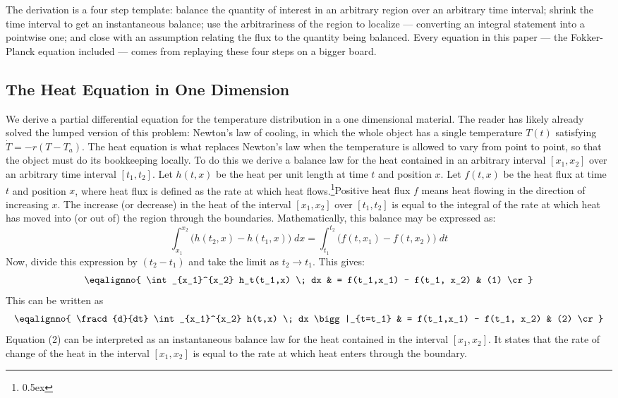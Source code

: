 The derivation is a four step template: balance the quantity of
interest in an arbitrary region over an arbitrary time interval;
shrink the time interval to get an instantaneous balance; use the
arbitrariness of the region to localize --- converting an integral
statement into a pointwise one; and close with an assumption relating
the flux to the quantity being balanced. Every equation in this paper
--- the Fokker-Planck equation included --- comes from replaying
these four steps on a bigger board.


\subsection{The Heat Equation in One Dimension}
We derive a partial differential equation for the temperature distribution
in a one dimensional material. The reader has likely already solved the
lumped version of this problem: Newton's law of cooling, in which the whole
object has a single temperature $T(t)$ satisfying $\dot T = -r(T - T_a)$.
The heat equation is what replaces Newton's law when the temperature is
allowed to vary from point to point, so that the object must do its
bookkeeping locally. To do this we
derive a balance law for the heat contained in an arbitrary interval
$[x_1,x_2]$ over an arbitrary time interval $[t_1, t_2]$.
Let $h(t,x)$ be the 
heat per unit length at time $t$ and position $x$. Let 
$f(t,x)$ be the heat flux at time $t$ and position $x$, where heat
flux is defined as the rate at which heat flows.\footnote{\raise 0.5ex \hbox{\dag}}{Positive heat flux $f$ means
heat flowing in the direction of increasing $x$.} The increase (or decrease) in 
the heat of 
the interval $[x_1, x_2]$ over $[t_1, t_2]$ is equal to the integral of
the rate at 
which heat has moved into (or out of) the region through the boundaries.
Mathematically, this balance may be expressed as:
$$
\int_{x_1}^{x_2} \big( h(t_2,x) - h(t_1,x) \big) \; dx  = 
\int_{t_1}^{t_2} \big( f(t, x_1) - f(t,x_2) \big) \; dt
$$
Now, divide this expression by $(t_2 - t_1)$ and take the
limit as $t_2 \rightarrow t_1$. This gives:
$$
\eqalignno{
\int_{x_1}^{x_2} h_t(t_1,x) \; dx & = f(t_1,x_1) - f(t_1, x_2) & (1) \cr}
$$
This can be written as
$$
\eqalignno{
\fracd{d}{dt} \int_{x_1}^{x_2} h(t,x) \; dx \bigg|_{t=t_1} & 
= f(t_1,x_1) - f(t_1, x_2) 
& (2) \cr}
$$
Equation (2) can be interpreted as an instantaneous balance law for the 
heat contained in the interval $[x_1, x_2]$. It states that the rate of 
change of the heat in the interval $[x_1, x_2]$ is equal to the rate 
at which heat enters through the boundary.


